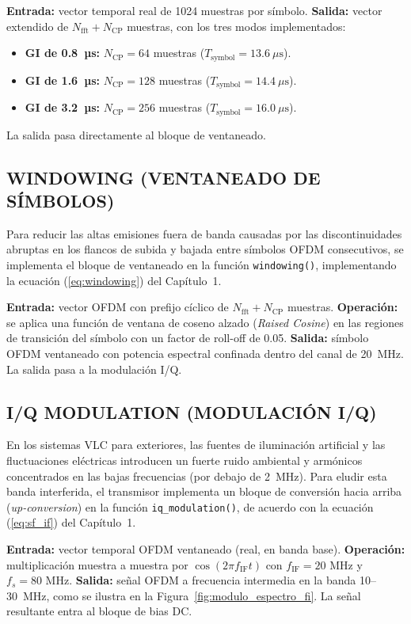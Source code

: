 \textbf{Entrada:} vector temporal real de 1024 muestras por símbolo. \textbf{Salida:} vector extendido de $N_{\text{fft}} + N_{\text{CP}}$ muestras, con los tres modos implementados:
\begin{itemize}
\item \textbf{GI de 0.8~µs:} $N_{\text{CP}} = 64$ muestras ($T_{\text{symbol}} = 13.6\ \mu\text{s}$).
\item \textbf{GI de 1.6~µs:} $N_{\text{CP}} = 128$ muestras ($T_{\text{symbol}} = 14.4\ \mu\text{s}$).
\item \textbf{GI de 3.2~µs:} $N_{\text{CP}} = 256$ muestras ($T_{\text{symbol}} = 16.0\ \mu\text{s}$).
\end{itemize}
La salida pasa directamente al bloque de ventaneado.

\subsection{WINDOWING (VENTANEADO DE SÍMBOLOS)}
Para reducir las altas emisiones fuera de banda causadas por las discontinuidades abruptas en los flancos de subida y bajada entre símbolos OFDM consecutivos, se implementa el bloque de ventaneado en la función \texttt{windowing()}, implementando la ecuación (\ref{eq:windowing}) del Capítulo~1.

\textbf{Entrada:} vector OFDM con prefijo cíclico de $N_{\text{fft}} + N_{\text{CP}}$ muestras. \textbf{Operación:} se aplica una función de ventana de coseno alzado (\textit{Raised Cosine}) en las regiones de transición del símbolo con un factor de roll-off de 0.05. \textbf{Salida:} símbolo OFDM ventaneado con potencia espectral confinada dentro del canal de 20~MHz. La salida pasa a la modulación I/Q.

\subsection{I/Q MODULATION (MODULACIÓN I/Q)}
En los sistemas VLC para exteriores, las fuentes de iluminación artificial y las fluctuaciones eléctricas introducen un fuerte ruido ambiental y armónicos concentrados en las bajas frecuencias (por debajo de 2~MHz). Para eludir esta banda interferida, el transmisor implementa un bloque de conversión hacia arriba (\textit{up-conversion}) en la función \texttt{iq\_modulation()}, de acuerdo con la ecuación (\ref{eq:sf_if}) del Capítulo~1.

\textbf{Entrada:} vector temporal OFDM ventaneado (real, en banda base). \textbf{Operación:} multiplicación muestra a muestra por $\cos(2\pi f_{\text{IF}} t)$ con $f_{\text{IF}} = 20\text{ MHz}$ y $f_s = 80\text{ MHz}$. \textbf{Salida:} señal OFDM a frecuencia intermedia en la banda 10--30~MHz, como se ilustra en la Figura~\ref{fig:modulo_espectro_fi}. La señal resultante entra al bloque de bias DC.


